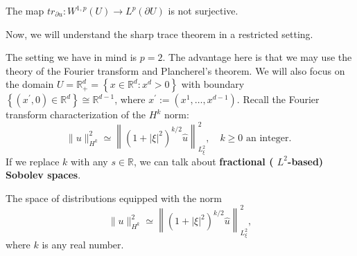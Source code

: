 \begin{remark}
The map $tr_{\partial u}: W^{1,p}(U) \to L^p(\partial  U)$ is not surjective.
\end{remark}

Now, we will understand the sharp trace theorem in a restricted setting.

The setting we have in mind is $p=2$. The advantage here is that we may use the theory of the Fourier transform and Plancherel's theorem. We will also focus on the domain $U=\mathbb{R}_{+}^{d}=\left\{x \in \mathbb{R}^{d}: x^{d}>0\right\}$ with boundary $\left\{\left(x^{\prime}, 0\right) \in \mathbb{R}^{d}\right\} \cong \mathbb{R}^{d-1}$, where $x^{\prime}:=\left(x^{1}, \ldots, x^{d-1}\right)$.
Recall the Fourier transform characterization of the $H^{k}$ norm:
$$
\|u\|_{H^{k}}^{2} \simeq\left\|\left(1+|\xi|^{2}\right)^{k / 2} \widehat{u}\right\|_{L_{\xi}^{2}}^{2}, \quad k \geq 0 \text { an integer. }
$$
If we replace $k$ with any $s \in \mathbb{R}$, we can talk about \textbf{fractional ( $L^{2}$-based) Sobolev spaces}.

\begin{definition}
The space of distributions equipped with the norm 
\[
    \|u\|_{H^{k}}^{2} \simeq\left\|\left(1+|\xi|^{2}\right)^{k / 2} \widehat{u}\right\|_{L_{\xi}^{2}}^{2},
\]
where $k$ is any real number.
\end{definition}

